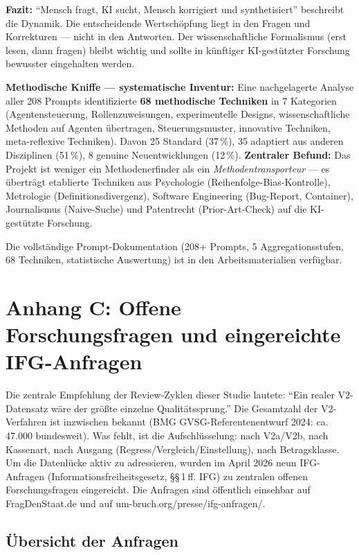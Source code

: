 \documentclass{umbruch-position}
\begin{document}
\textbf{Fazit:} ``Mensch fragt, KI sucht, Mensch korrigiert und synthetisiert'' beschreibt die Dynamik. Die entscheidende Wertschöpfung liegt in den Fragen und Korrekturen --- nicht in den Antworten. Der wissenschaftliche Formalismus (erst lesen, dann fragen) bleibt wichtig und sollte in künftiger KI-gestützter Forschung bewusster eingehalten werden.

\smallskip
\noindent\textbf{Methodische Kniffe --- systematische Inventur:} Eine nachgelagerte Analyse aller 208 Prompts identifizierte \textbf{68 methodische Techniken} in 7 Kategorien (Agentensteuerung, Rollenzuweisungen, experimentelle Designs, wissenschaftliche Methoden auf Agenten übertragen, Steuerungsmuster, innovative Techniken, meta-reflexive Techniken). Davon 25 Standard (37\,\%), 35 adaptiert aus anderen Disziplinen (51\,\%), 8 genuine Neuentwicklungen (12\,\%). \textbf{Zentraler Befund:} Das Projekt ist weniger ein Methodenerfinder als ein \textit{Methodentransporteur} --- es überträgt etablierte Techniken aus Psychologie (Reihenfolge-Bias-Kontrolle), Metrologie (Definitionsdivergenz), Software Engineering (Bug-Report, Container), Journalismus (Naive-Suche) und Patentrecht (Prior-Art-Check) auf die KI-gestützte Forschung.

\smallskip
\noindent Die vollständige Prompt-Dokumentation (208+ Prompts, 5 Aggregationsstufen, 68 Techniken, statistische Auswertung) ist in den Arbeitsmaterialien verfügbar.

\newpage
\section*{Anhang C: Offene Forschungsfragen und eingereichte IFG-Anfragen}
\label{sec:appendix-ifg}

Die zentrale Empfehlung der Review-Zyklen dieser Studie lautete: ``Ein realer V2-Datensatz wäre der größte einzelne Qualitätssprung.'' Die Gesamtzahl der V2-Verfahren ist inzwischen bekannt (BMG GVSG-Referentenentwurf 2024: ca.\,47.000 bundesweit). Was fehlt, ist die Aufschlüsselung: nach V2a/V2b, nach Kassenart, nach Ausgang (Regress/Vergleich/Einstellung), nach Betragsklasse. Um die Datenlücke aktiv zu adressieren, wurden im April 2026 neun IFG-Anfragen (Informationsfreiheitsgesetz, \S\S\,1\,ff. IFG) zu zentralen offenen Forschungsfragen eingereicht. Die Anfragen sind öffentlich einsehbar auf FragDenStaat.de und auf um-bruch.org/presse/ifg-anfragen/.

\subsection*{Übersicht der Anfragen}
\end{document}
